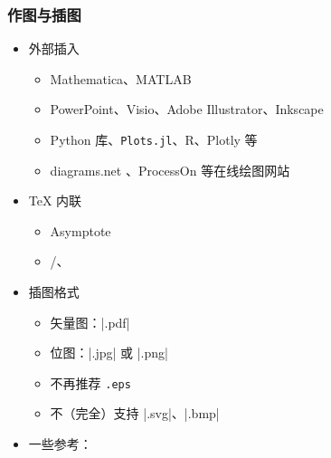     \begin{frame}[fragile]
      \frametitle{作图与插图}
      \begin{itemize}
        \item 外部插入
    
          \begin{itemize}
            \item Mathematica、MATLAB
            \item PowerPoint、Visio、Adobe Illustrator、Inkscape
            \item Python  库、\texttt{Plots.jl}、R、Plotly 等
            \item diagrams.net 、ProcessOn  等在线绘图网站
          \end{itemize}
    
        \item \TeX{} 内联
    
          \begin{itemize}
            \item Asymptote
            \item \alert{/、}
          \end{itemize}
    
        \item 插图格式
    
          \begin{itemize}
            \item 矢量图：|.pdf|
            \item 位图：|.jpg| 或 |.png|
            \item \alert{不再推荐 \texttt{.eps}}
            \item 不（完全）支持 |.svg|、|.bmp|
          \end{itemize}
    
        \item 一些参考：
      \end{itemize}
    \end{frame}

